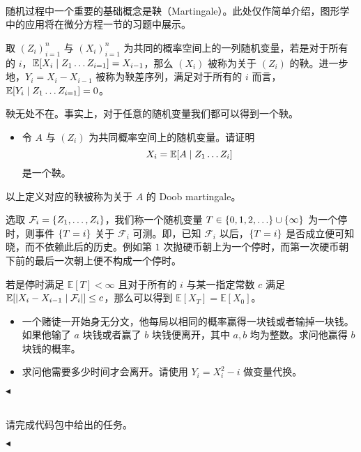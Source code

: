 \documentclass[11pt]{article}
\newenvironment{question}[2][Question]{\begin{trivlist}
\item[\hskip \labelsep {\bfseries #1}\hskip \labelsep {\bfseries #2.}]}{\hfill$\blacktriangleleft$\end{trivlist}}
\newcommand\E{\mathbb{E}}
\begin{document}
    \begin{question}{4 (15') (鞅)}~\\
        随机过程中一个重要的基础概念是鞅（Martingale）。此处仅作简单介绍，图形学中的应用将在微分方程一节的习题中展示。
        
        取 $(Z_i)_{i=1}^n$ 与 $(X_i)_{i=1}^n$ 为共同的概率空间上的一列随机变量，若是对于所有的 $i$，$\E\qty[X_i \mid Z_1 \ldots Z_{i=1} ] = X_{i-1}$，那么 $(X_i)$ 被称为关于 $(Z_i)$ 的鞅。进一步地，$Y_i = X_i - X_{i-1}$ 被称为鞅差序列，满足对于所有的 $i$ 而言，$\E\qty[Y_i \mid Z_1 \ldots Z_{i=1} ] = 0$。

        鞅无处不在。事实上，对于任意的随机变量我们都可以得到一个鞅。

        \begin{itemize}
            \item [a (5')] 令 $A$ 与 $(Z_i)$ 为共同概率空间上的随机变量。请证明
            \[ X_i = \E\qty[A \mid Z_1 \ldots Z_i] \]
            是一个鞅。
        \end{itemize}

        以上定义对应的鞅被称为关于 $A$ 的 Doob martingale。 

        选取 $\mathcal{F}_i = \qty{Z_1, \ldots, Z_i}$，我们称一个随机变量 $T \in \qty{0, 1, 2, \ldots} \cup \qty{\infty}$ 为一个停时，则事件 $\qty{T = i}$ 关于 $\mathcal{F}_i$ 可测。即，已知 $\mathcal{F}_i$ 以后，$\qty{T = i}$ 是否成立便可知晓，而不依赖此后的历史。例如第 $1$ 次抛硬币朝上为一个停时，而第一次硬币朝下前的最后一次朝上便不构成一个停时。

        若是停时满足 $\E[T] < \infty$ 且对于所有的 $i$ 与某一指定常数 $c$ 满足 $\E\qty[\abs{X_i - X_{i-1} \mid \mathcal{F}_i}] \leq c$，那么可以得到 $\E[X_T] = \E[X_0]$。
        
        \begin{itemize}
            \item [b (5')] 一个赌徒一开始身无分文，他每局以相同的概率赢得一块钱或者输掉一块钱。如果他输了 $a$ 块钱或者赢了 $b$ 块钱便离开，其中 $a, b$ 均为整数。求问他赢得 $b$ 块钱的概率。
            \item [c (5')] 求问他需要多少时间才会离开。请使用 $Y_i = X_i^2 -i$ 做变量代换。
        \end{itemize}
        
        
    \end{question}    
    \begin{question}{5 (30') (代码填空)}~\\
        请完成代码包中给出的任务。
        
    \end{question}    
\end{document}
